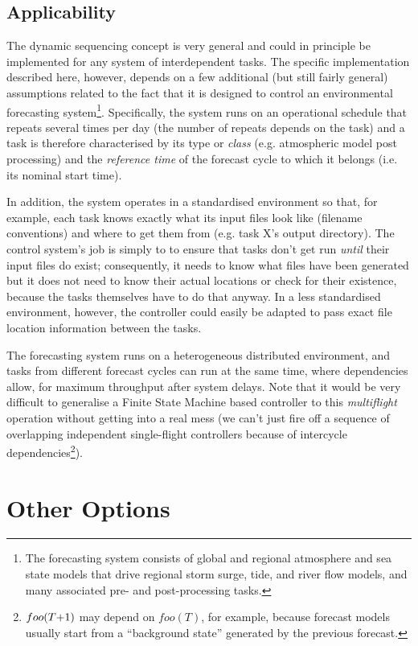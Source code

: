 \documentclass[11pt,a4paper]{report}
\begin{document}
\subsection{Applicability}

The dynamic sequencing concept is very general and could in principle be
implemented for any system of interdependent tasks.  The specific
implementation described here, however, depends on a few additional (but
still fairly general) assumptions related to the fact that it is
designed to control an environmental forecasting system\footnote{The
forecasting system consists of global and regional atmosphere and sea
state models that drive regional storm surge, tide, and river flow
models, and many associated pre- and post-processing tasks.}.
Specifically, the system runs on an operational schedule that repeats
several times per day (the number of repeats depends on the task) and a
task is therefore characterised by its type or {\em class} (e.g.
atmospheric model post processing) and the {\em reference time} of the
forecast cycle to which it belongs (i.e. its nominal start time). 

In addition, the system operates in a standardised environment so that,
for example, each task knows exactly what its input files look like
(filename conventions) and where to get them from (e.g. task X's output
directory). The control system's job is simply to to ensure that tasks
don't get run {\em until} their input files do exist; consequently, it
needs to know what files have been generated but it does not need
to know their actual locations or check for their existence, because the
tasks themselves have to do that anyway. In a less standardised
environment, however, the controller could easily be adapted to pass
exact file location information between the tasks.

The forecasting system runs on a heterogeneous distributed environment,
and tasks from different forecast cycles can run at the same time, where
dependencies allow, for maximum throughput after system delays. Note
that it would be very difficult to generalise a Finite State Machine
based controller to this {\em multiflight} operation without getting
into a real mess (we can't just fire off a sequence of overlapping
independent single-flight controllers because of intercycle
dependencies\footnote{$foo(T\negmedspace +\negmedspace 1)$ may depend on
$foo(T)$, for example, because forecast models usually start from a
``background state'' generated by the previous forecast.}). 

\section{Other Options}
\end{document}
